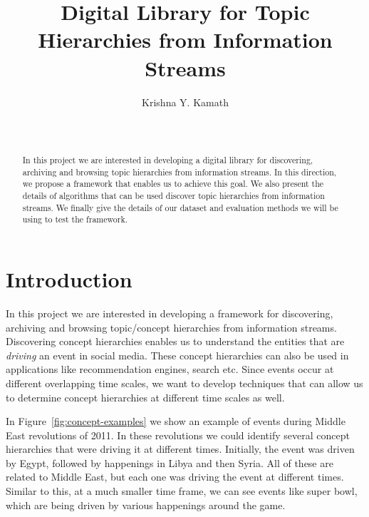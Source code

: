 \documentclass{sig-alternate}
\begin{document}
\title{Digital Library for Topic Hierarchies from Information Streams}

\author{
\alignauthor Krishna Y. Kamath\\
      \\
       \\
}

\maketitle


\begin{abstract}
In this project we are interested in developing a digital library for discovering, archiving and browsing topic hierarchies from information streams. In this direction, we propose a framework that enables us to achieve this goal. We also present the details of algorithms that can be used discover topic hierarchies from information streams. We finally give the details of our dataset and evaluation methods we will be using to test the framework.
\end{abstract}

\section{Introduction}
In this project we are interested in developing a framework for discovering, archiving and browsing topic/concept hierarchies from information streams. Discovering concept hierarchies enables us to understand the entities that are \textit{driving} an event in social media. These concept hierarchies can also be used in applications like recommendation engines, search etc. Since events occur at different overlapping time scales, we want to develop techniques that can allow us to determine concept hierarchies at different time scales as well. 

In Figure~\ref{fig:concept-examples} we show an example of events during Middle East revolutions of 2011.  In these revolutions we could identify several concept hierarchies that were driving it at different times. Initially, the event was driven by Egypt, followed by happenings in Libya and then Syria. All of these are related to Middle East, but each one was driving the event at different times. Similar to this, at a much smaller time frame, we can see events like super bowl, which are being driven by various happenings around the game.
\end{document}
